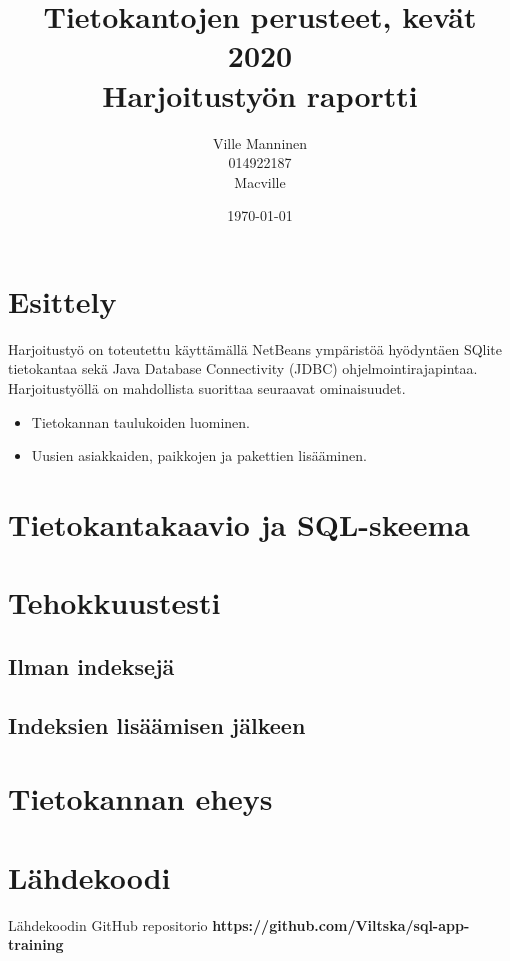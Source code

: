 \documentclass[12pt,a4paper]{article}
\begin{document}
\title{Tietokantojen perusteet, kevät 2020 \\
Harjoitustyön raportti}
\author{Ville Manninen \\014922187 \\Macville}
\date{\today}
\cleapage\maketitle
\thispagestyle{empty}


\tableofcontents
\newpage
\section{Esittely}
Harjoitustyö on toteutettu käyttämällä NetBeans ympäristöä hyödyntäen SQlite tietokantaa sekä Java Database Connectivity (JDBC) ohjelmointirajapintaa. Harjoitustyöllä on mahdollista suorittaa seuraavat ominaisuudet.
\begin{itemize}
\item Tietokannan taulukoiden luominen.
\item Uusien asiakkaiden, paikkojen ja pakettien lisääminen.
\end{itemize}



\newpage
\section{Tietokantakaavio ja SQL-skeema}

\newpage
\section{Tehokkuustesti}
\subsection*{Ilman indeksejä}
\subsection*{Indeksien lisäämisen jälkeen}

\newpage
\section{Tietokannan eheys}



\newpage
\section{Lähdekoodi}
Lähdekoodin GitHub repositorio \left \textbf{https://github.com/Viltska/sql-app-training} \right


\newpage
\end{document}
